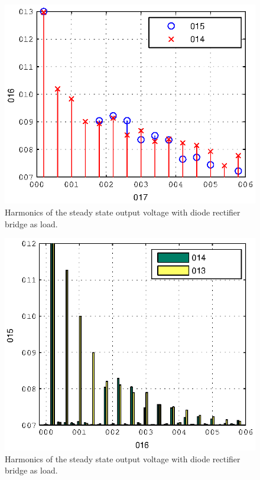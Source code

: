\documentclass[conference,10pt]{IEEEtran}
\begin{document}
\begin{figure}[!h]
\centering

\includegraphics{fig/steady_state_harmonics}
\caption{Harmonics of the steady state output voltage with diode rectifier bridge as load.}
\label{fig:ss_harm}
\end{figure}

\begin{figure}[!h]
\centering

\includegraphics{fig/steady_state_harmonics_linear}
\caption{Harmonics of the steady state output voltage with diode rectifier bridge as load.}
\label{fig:ss_harm}
\end{figure}



\end{document}
